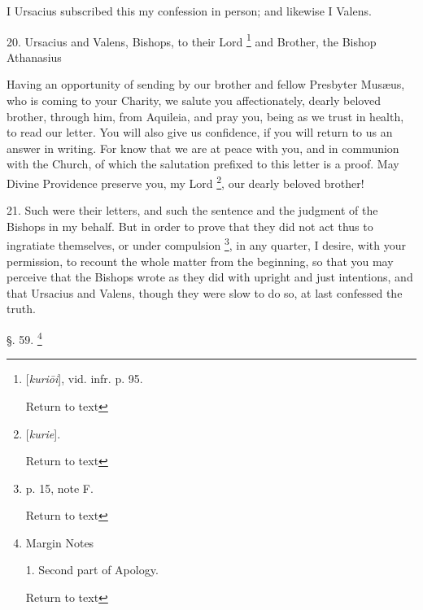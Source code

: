 I Ursacius subscribed this my confession in
person; and likewise I Valens.

20. Ursacius and Valens, Bishops, to their Lord \footnote{[\emph{kuri\={o}i}], vid. infr. p. 95.

Return to text} and Brother, the Bishop Athanasius

Having an opportunity of sending by our brother
and fellow Presbyter Musæus, who is coming to your Charity, we salute
you affectionately, dearly beloved brother, through him, from Aquileia,
and pray you, being as we trust in health, to read our letter. You
will also give us confidence, if you will return to us an answer in
writing. For know that we are at peace with you, and in communion with
the Church, of which the salutation prefixed to this letter is a
proof. May Divine Providence preserve you, my Lord \footnote{[\emph{kurie}].

Return to text}, our dearly beloved brother!

21. Such were their letters, and such the
sentence and the judgment of the Bishops in my behalf. But in order to
prove that they did not act thus to ingratiate themselves, or under
compulsion \footnote{p. 15, note F.

Return to text}, in any
quarter, I desire, with your permission, to recount the whole matter
from the beginning, so that you may perceive that the Bishops wrote as
they did with upright and just intentions, and that Ursacius and
Valens, though they were slow to do so, at last confessed the truth.


§. 59. \footnote{Margin Notes

1. Second part of Apology.

Return to text}

